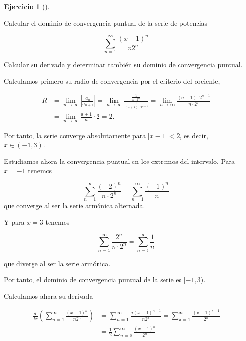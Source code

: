 \documentclass[
  spanish,
  a4paper,
]{scrreport}
\theoremstyle{definition}
\newtheorem{exercise}{Ejercicio}[chapter]
\theoremstyle{remark}
\begin{document}
\begin{exercise}[]\protect\hypertarget{exr-6}{}\label{exr-6}

Calcular el dominio de convergencia puntual de la serie de potencias

\[
\sum _{n=1}^{\infty} \frac{(x-1)^n}{n2^n}
\]

Calcular su derivada y determinar también su dominio de convergencia
puntual.

\end{exercise}

\begin{tcolorbox}[enhanced jigsaw, arc=.35mm, bottomrule=.15mm, bottomtitle=1mm, breakable, colback=white, colbacktitle=quarto-callout-tip-color!10!white, colframe=quarto-callout-tip-color-frame, coltitle=black, left=2mm, leftrule=.75mm, opacityback=0, opacitybacktitle=0.6, rightrule=.15mm, title=\textcolor{quarto-callout-tip-color}{\faLightbulb}\hspace{0.5em}{Solución}, titlerule=0mm, toprule=.15mm, toptitle=1mm]

Calculamos primero su radio de convergencia por el criterio del
cociente,

\begin{align*}
R 
&= \lim_{n\to\infty} \left|\frac{a_n}{a_{n+1}}\right| 
= \lim_{n\to\infty} \frac{\frac{1}{n \cdot 2^n}}{\frac{1}{(n+1) \cdot 2^{n+1}}} 
= \lim_{n\to\infty} \frac{(n+1) \cdot 2^{n+1}}{n \cdot 2^n} \\
&= \lim_{n\to\infty} \frac{n+1}{n} \cdot 2 
= 2.
\end{align*}

Por tanto, la serie converge absolutamente para \(|x-1| < 2\), es decir,
\(x \in (-1, 3)\).

Estudiamos ahora la convergencia puntual en los extremos del intervalo.
Para \(x=-1\) tenemos

\[
\sum_{n=1}^{\infty} \frac{(-2)^n}{n \cdot 2^n} 
= \sum_{n=1}^{\infty} \frac{(-1)^n}{n}
\] que converge al ser la serie armónica alternada.

Y para \(x=3\) tenemos

\[
\sum_{n=1}^{\infty} \frac{2^n}{n \cdot 2^n} 
= \sum_{n=1}^{\infty} \frac{1}{n} 
\]

que diverge al ser la serie armónica.

Por tanto, el dominio de convergencia puntual de la serie es
\([-1, 3)\).

Calculamos ahora su derivada

\begin{align*}
\frac{d}{dx}\left(\sum _{n=1}^{\infty} \frac{(x-1)^n}{n2^n}\right)
&= \sum_{n=1}^{\infty} \frac{n(x-1)^{n-1}}{n2^n} 
= \sum_{n=1}^{\infty} \frac{(x-1)^{n-1}}{2^n} \\
&= \frac{1}{2}\sum_{n=0}^{\infty} \frac{(x-1)^n}{2^n}
\end{align*}


\end{tcolorbox}
\end{document}

